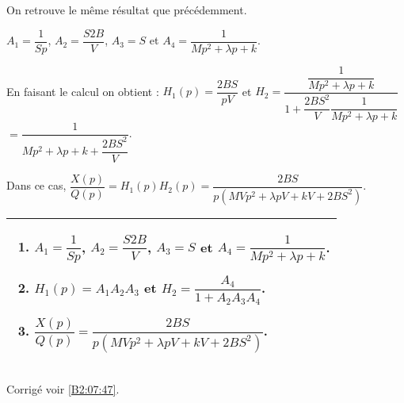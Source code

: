 \footnotesize
\begin{center}
\end{center}
\normalsize

On retrouve le même résultat que précédemment. 


$A_1=\dfrac{1}{Sp}$,  $A_2 = \dfrac{S2B}{V} $,  $A_3 = S$  et $A_4 = \dfrac{1}{Mp^2  +\lambda p  + k}$.


En faisant le calcul on obtient : 
$H_1(p)=\dfrac{2BS}{pV}  $ et $H_2 = \dfrac{\dfrac{1}{Mp^2  +\lambda p  + k}}{1+ \dfrac{2BS^2}{V}\dfrac{1}{Mp^2  +\lambda p  + k} }$  $= \dfrac{1}{Mp^2  +\lambda p  + k+ \dfrac{2BS^2}{V} }$.


\else
\fi

\ifprof

Dans ce cas, $\dfrac{X(p)}{Q(p)}=H_1(p)H_2(p)=\dfrac{2BS}{p\left(MVp^2  +\lambda pV  + kV+ 2BS^2\right) }$.

\else
\fi








\ifprof
\else
\footnotesize
\noindent
\begin{tabular}{|p{.95\linewidth}|}
\hline
\begin{enumerate}
\item $A_1=\dfrac{1}{Sp}$,  $A_2 = \dfrac{S2B}{V} $,  $A_3 = S$  et $A_4 = \dfrac{1}{Mp^2  +\lambda p  + k}$.
\item $H_1(p)=A_1  A_2A_3$ et $H_2 = \dfrac{A_4}{1+ A_2A_3A_4 }$.
\item $\dfrac{X(p)}{Q(p)}=\dfrac{2BS}{p\left(MVp^2  +\lambda pV  + kV+ 2BS^2\right) }$.
\end{enumerate} \\ \hline
\end{tabular}
\normalsize
\begin{flushright}
\footnotesize{Corrigé  voir \ref{B2:07:47}.}
\end{flushright}%
\fi